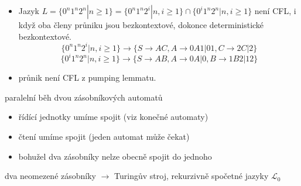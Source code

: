 \documentclass[../main.tex]{subfiles}
\begin{document}
\begin{example}
    \begin{itemize}
        \item Jazyk $L = \{0^n1^n2^n|n\geq 1\} = \{0^n1^n2^i | n, i \geq 1\} \cap \{0^i1^n2^n|n,i\geq 1\}$
        není CFL, i když oba členy průniku jsou bezkontextové, dokonce deterministické bezkontextové.
        \[\{0^n1^n2^i|n,i \geq 1\} \rightarrow \{S \rightarrow AC, A \rightarrow 0A1 | 01, C \rightarrow 2C|2\}\]
        \[\{0^i1^n2^n|n,i \geq 1\} \rightarrow \{S \rightarrow AB, A \rightarrow 0A | 0, B \rightarrow 1B2|12\}\]
        \item průnik není CFL z pumping lemmatu. 
    \end{itemize}
    paralelní běh dvou zásobníkových automatů
    \begin{itemize}
        \item řídící jednotky umíme spojit (viz konečné automaty)
        \item čtení umíme spojit (jeden automat může čekat)
        \item bohužel dva zásobníky nelze obecně spojit do jednoho
    \end{itemize}
    dva neomezené zásobníky $\rightarrow$ Turingův stroj, rekurzivně spočetné jazyky $\mathcal{L}_0$ 
\end{example}
\end{document}
